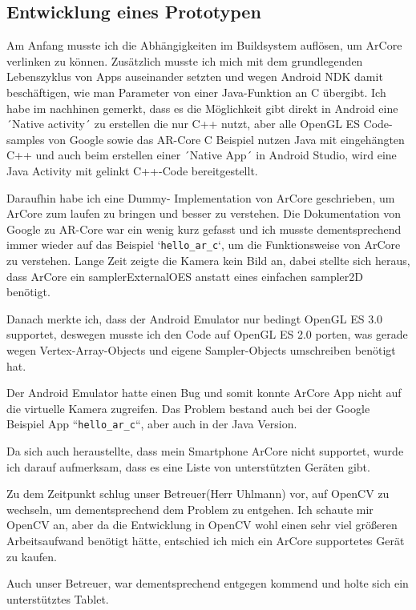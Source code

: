 \subsection{Entwicklung eines Prototypen}
Am Anfang musste ich die Abhängigkeiten im Buildsystem auflösen, um
ArCore verlinken zu können. Zusätzlich musste ich mich mit dem grundlegenden Lebenszyklus von Apps
auseinander setzten und wegen Android NDK damit beschäftigen, wie man
Parameter von einer Java-Funktion an C übergibt.
Ich habe im nachhinen gemerkt, dass es die Möglichkeit gibt direkt in Android eine
´Native activity´\cite{android_native_activity} zu erstellen die nur C++ nutzt, aber alle OpenGL ES Code-samples von Google\cite{android_ndk_samples_2021}
sowie das AR-Core C Beispiel\cite{ar_core_sdk} nutzen Java mit eingehängten C++ und auch beim erstellen einer
´Native App´ in Android Studio, wird eine Java Activity mit gelinkt C++-Code bereitgestellt.
\par
Daraufhin habe ich eine Dummy-
Implementation von ArCore geschrieben, um ArCore zum laufen zu bringen und besser zu verstehen.
Die Dokumentation von Google zu AR-Core war ein wenig kurz gefasst und ich musste dementsprechend immer wieder auf das Beispiel `\verb|hello_ar_c|`, um die Funktionsweise von ArCore zu verstehen.
Lange Zeit zeigte die Kamera kein Bild an, dabei stellte sich heraus, dass ArCore ein samplerExternalOES anstatt eines einfachen sampler2D benötigt.
\par
Danach merkte ich, dass der Android Emulator nur bedingt OpenGL ES 3.0 supportet\cite{android_emulator_gles3_issue},
deswegen musste ich den Code auf OpenGL ES 2.0 porten, was gerade wegen
Vertex-Array-Objects und eigene Sampler-Objects
umschreiben benötigt hat.
\par
Der Android Emulator hatte einen Bug und somit konnte ArCore App nicht
auf die virtuelle Kamera zugreifen. Das Problem bestand auch bei der Google Beispiel App
``\verb|hello_ar_c|``, aber auch in der Java Version.
\par
Da sich auch heraustellte, dass mein Smartphone ArCore nicht supportet, wurde ich darauf
aufmerksam, dass es eine Liste von unterstützten Geräten gibt. \cite{ar_core_supported_devices}
\par
Zu dem Zeitpunkt schlug unser Betreuer(Herr Uhlmann) vor, auf OpenCV\cite{openCV} zu wechseln, um dementsprechend dem Problem
zu entgehen. Ich schaute mir OpenCV an, aber da die Entwicklung in OpenCV wohl einen sehr viel
größeren Arbeitsaufwand benötigt hätte, entschied ich mich ein ArCore supportetes Gerät zu kaufen.
\par
Auch unser Betreuer, war dementsprechend entgegen kommend und holte sich ein unterstütztes Tablet.

